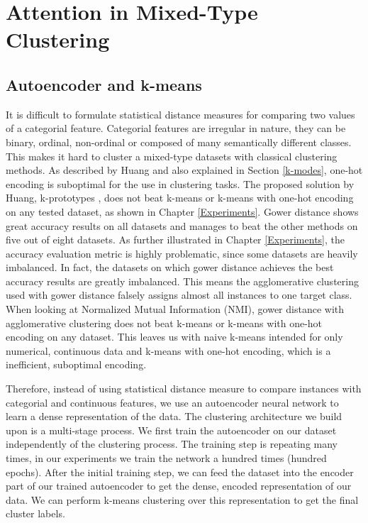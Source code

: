 \chapter{Attention in Mixed-Type Clustering}

\section{Autoencoder and k-means}

It is difficult to formulate statistical distance measures for comparing two values of a categorial feature. Categorial features are irregular in nature, they can be binary, ordinal, non-ordinal or composed of many semantically different classes. This makes it hard to cluster a mixed-type datasets with classical clustering methods. As described by Huang \cite{kmodes} and also explained in Section \ref{k-modes}, one-hot encoding is suboptimal for the use in clustering tasks. The proposed solution by Huang, k-prototypes \cite{kmodes}, does not beat k-means or k-means with one-hot encoding on any tested dataset, as shown in Chapter \ref{Experiments}. Gower distance shows great accuracy results on all datasets and manages to beat the other methods on five out of eight datasets. As further illustrated in Chapter \ref{Experiments}, the accuracy evaluation metric is highly problematic, since some datasets are heavily imbalanced. In fact, the datasets on which gower distance achieves the best accuracy results are greatly imbalanced. This means the agglomerative clustering used with gower distance falsely assigns almost all instances to one target class. When looking at Normalized Mutual Information (NMI), gower distance with agglomerative clustering does not beat k-means or k-means with one-hot encoding on any dataset. This leaves us with naive k-means intended for only numerical, continuous data and k-means with one-hot encoding, which is a inefficient, suboptimal encoding.

Therefore, instead of using statistical distance measure to compare instances with categorial and continuous features, we use an autoencoder neural network to learn a dense representation of the data. The clustering architecture we build upon is a multi-stage process. We first train the autoencoder on our dataset independently of the clustering process. The training step is repeating many times, in our experiments we train the network a hundred times (hundred epochs). After the initial training step, we can feed the dataset into the encoder part of our trained autoencoder to get the dense, encoded representation of our data. We can perform k-means clustering over this representation to get the final cluster labels.

